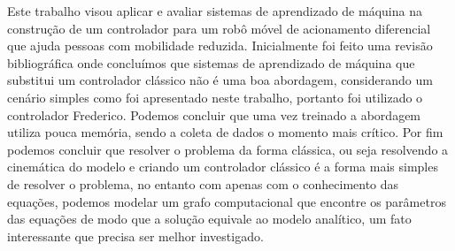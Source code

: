 
\label{Cap:Conclusao}

Este trabalho visou aplicar e avaliar sistemas de aprendizado de máquina
na construção de um controlador para um robô móvel de acionamento diferencial
que ajuda pessoas com mobilidade reduzida. Inicialmente foi feito uma
revisão bibliográfica onde concluímos que sistemas de aprendizado de
máquina que substitui um controlador clássico não é uma boa abordagem,
considerando um cenário simples como foi apresentado neste trabalho,
portanto foi utilizado o controlador Frederico. 
Podemos concluir que uma vez treinado a abordagem utiliza pouca memória,
sendo a coleta de dados o momento mais crítico. Por fim podemos concluir
que resolver o problema da forma clássica, ou seja resolvendo a cinemática
do modelo e criando um controlador clássico é a forma mais simples
de resolver o problema, no entanto com apenas com o conhecimento das equações,
podemos modelar um grafo computacional que encontre os parâmetros das
equações de modo que a solução equivale ao modelo analítico, um fato
interessante que precisa ser melhor investigado.